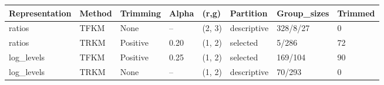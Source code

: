 \begin{tabular}{llllllll}
\toprule
Representation & Method & Trimming & Alpha & (r,g) & Partition & Group\_sizes & Trimmed \\
\midrule
ratios & TFKM & None & -- & (2, 3) & descriptive & 328/8/27 & 0 \\
ratios & TRKM & Positive & 0.20 & (1, 2) & selected & 5/286 & 72 \\
log\_levels & TFKM & Positive & 0.25 & (1, 2) & selected & 169/104 & 90 \\
log\_levels & TRKM & None & -- & (1, 2) & descriptive & 70/293 & 0 \\
\bottomrule
\end{tabular}
